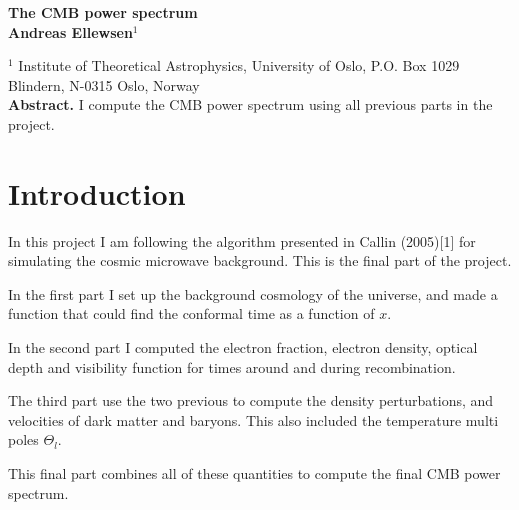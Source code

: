 \documentclass[a4paper]{report}
\begin{document}
  

\vspace*{4ex}

\begin{center}
  {\Large \bf The CMB power spectrum}\\[4ex]
  {\large \bf Andreas Ellewsen$^1$}\\[4ex]
  \begin{minipage}[t]{15cm}
        $^1$ Institute of Theoretical Astrophysics, University of Oslo, P.O. Box 1029 Blindern, N-0315 Oslo, Norway \\

    {\bf Abstract.} I compute the CMB power spectrum using all previous parts in the project. 
    
  \vspace*{2ex}
  \end{minipage}
\end{center}
\section{Introduction}\label{sec:introduction}
In this project I am following the algorithm presented in Callin (2005)[1] for simulating the cosmic microwave background.  
This is the final part of the project.

In the first part I set up the background cosmology of the universe, and made a function that could find the conformal time as a function of $x$. 

In the second part I computed the electron fraction, electron density, optical depth and visibility function for times around and during recombination. 

The third part use the two previous to compute the density perturbations, and velocities of dark matter and baryons. This also included the temperature multi poles $\Theta_l$.

This final part combines all of these quantities to compute the final CMB power spectrum.

\end{document}
